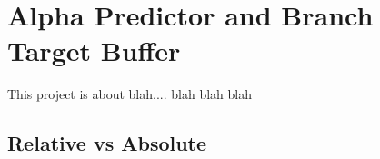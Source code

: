 \section{Alpha Predictor and Branch Target Buffer}
This project is about blah.... blah blah blah

\subsection{Relative vs Absolute}
